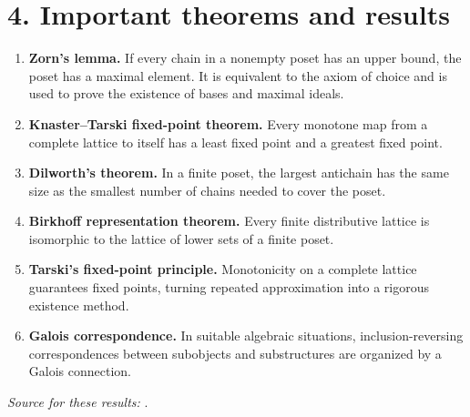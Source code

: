 \section*{4. Important theorems and results}
\begin{enumerate}[leftmargin=*,itemsep=0.35em]
\item \textbf{Zorn's lemma.} If every chain in a nonempty poset has an upper bound, the poset has a maximal element. It is equivalent to the axiom of choice and is used to prove the existence of bases and maximal ideals.

\item \textbf{Knaster--Tarski fixed-point theorem.} Every monotone map from a complete lattice to itself has a least fixed point and a greatest fixed point.

\item \textbf{Dilworth's theorem.} In a finite poset, the largest antichain has the same size as the smallest number of chains needed to cover the poset.

\item \textbf{Birkhoff representation theorem.} Every finite distributive lattice is isomorphic to the lattice of lower sets of a finite poset.

\item \textbf{Tarski's fixed-point principle.} Monotonicity on a complete lattice guarantees fixed points, turning repeated approximation into a rigorous existence method.

\item \textbf{Galois correspondence.} In suitable algebraic situations, inclusion-reversing correspondences between subobjects and substructures are organized by a Galois connection.
\end{enumerate}
\noindent\emph{Source for these results:} \cite{order_theory_ref1}.

\theoryapplications
{}

